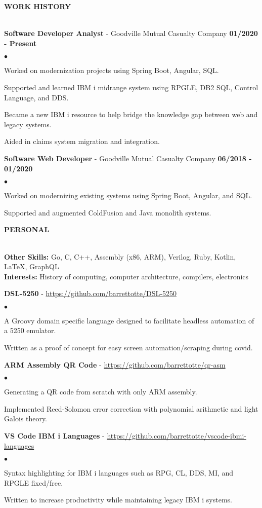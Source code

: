 \documentclass{article}
\newcommand{\lineunder}{
	\vspace*{-4pt}\\ 
	\hspace*{-18pt}\hrulefill \\
}
\newcommand{\header}[1]{
	{\hspace*{-15pt}\vspace*{6pt}\textsc{#1}}\vspace*{-6pt}\lineunder
}
\newcommand{\employer}[3]{
	\textbf{#1} - #2 \vspace*{2pt} \hfill \textbf{#3} \vspace*{2pt}
}
\newcommand{\project}[2]{
	\vspace*{3pt} \textbf{#1} - \small{\href{#2}{#2}}
}
\newenvironment{resumelist}{
	\vspace*{2pt}
	\begin{list}
		{\small$\bullet$}{\topsep 0pt \itemsep -2pt}}{\vspace*{4pt}
	\end{list}
}
\newcommand{\resumeheader}[1]{
	\vspace*{14pt}
	\header{\textbf{#1}}
    \vspace*{5pt}
}
\begin{document}
	\resumeheader{WORK HISTORY}
        \employer
			{Software Developer Analyst}{Goodville Mutual Casualty Company}{01/2020 - Present}
			\begin{resumelist}
				\item Worked on modernization projects using Spring Boot, Angular, SQL.
				\item Supported and learned IBM i midrange system using RPGLE, DB2 SQL, Control Language, and DDS.
				\item Became a new IBM i resource to help bridge the knowledge gap between web and legacy systems.
				\item Aided in claims system migration and integration.
			\end{resumelist}
            \vspace*{4pt}
		\employer
			{Software Web Developer}{Goodville Mutual Casualty Company}{06/2018 - 01/2020}
			\begin{resumelist}
				\item Worked on modernizing existing systems using Spring Boot, Angular, and SQL.
				\item Supported and augmented ColdFusion and Java monolith systems.
			\end{resumelist}
	
	\resumeheader{PERSONAL}
		\textbf{Other Skills:}
			Go, C, {C\tiny{++}}, Assembly (x86, ARM), Verilog, Ruby, Kotlin, LaTeX, GraphQL\\
			\vspace*{5pt}
		\textbf{Interests:}
			History of computing, computer architecture, compilers, electronics\\
			\vspace*{12pt}
		\project
			{DSL-5250}{https://github.com/barrettotte/DSL-5250}
			\begin{resumelist}
				\item A Groovy domain specific language designed to facilitate headless automation of a 5250 emulator.
				\item Written as a proof of concept for easy screen automation/scraping during covid.
			\end{resumelist}
		\project
			{ARM Assembly QR Code}{https://github.com/barrettotte/qr-asm}
			\begin{resumelist}
				\item Generating a QR code from scratch with only ARM assembly.
				\item Implemented Reed-Solomon error correction with polynomial arithmetic and light Galois theory.
			\end{resumelist}
		\project
			{VS Code IBM i Languages}{https://github.com/barrettotte/vscode-ibmi-languages}
			\begin{resumelist}
				\item Syntax highlighting for IBM i languages such as RPG, CL, DDS, MI, and RPGLE fixed/free.
				\item Written to increase productivity while maintaining legacy IBM i systems.
			\end{resumelist}
\end{document}
